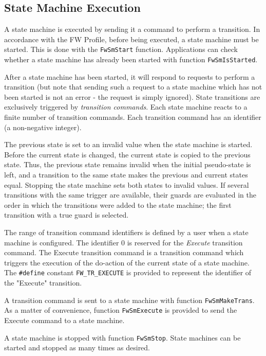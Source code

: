 \documentclass[manual]{../fwprofile}
\begin{document}
\subsection{State Machine Execution}\label{sec:SmExecution}
A state machine is executed by sending it a command to perform a transition. In accordance with the FW Profile, 
before being executed, a state machine must be started. This is done with the \texttt{FwSmStart} function. Applications 
can check whether a state machine has already been started with function \texttt{FwSmIsStarted}.

After a state machine has been started, it will respond to requests to perform a transition (but note that sending 
such a request to a state machine which has not been started is not an error - the request is simply ignored). 
State transitions are exclusively triggered by \emph{transition commands}. Each state machine reacts to a finite 
number of transition commands. Each transition command has an identifier (a non-negative integer). 

The previous state is set to an invalid value when the state machine is started. Before the current state is changed,
the current state is copied to the previous state. Thus, the previous state remains invalid when the initial pseudo-state is
left, and a transition to the same state makes the previous and current states equal. Stopping the state machine
sets both states to invalid values. If several transitions with the same trigger are available, their guards are
evaluated in the order in which the transitions were added to the state machine; the first transition with a true
guard is selected.

The range of transition command identifiers is defined by a user when a state machine is configured. The identifier 0 
is reserved for the \emph{Execute} transition command. The Execute transition command is a transition command which 
triggers the execution of the do-action of the current state of a state machine. The \texttt{\#define} constant 
\texttt{FW\_TR\_EXECUTE} is provided to represent the identifier of the "Execute" transition.

A transition command is sent to a state machine with function \texttt{FwSmMakeTrans}. As a matter of convenience, 
function \texttt{FwSmExecute} is provided to send the Execute command to a state machine.

A state machine is stopped with function \texttt{FwSmStop}. State machines can be started and stopped as many times 
as desired.
\end{document}

